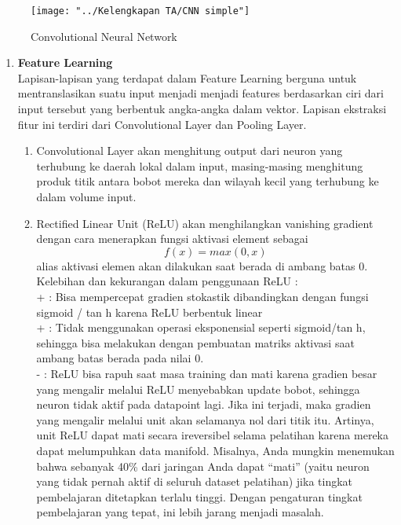 \documentclass[a4paper]{article}
\begin{document}
			\begin{figure}[h]
				\centering
				\texttt{[image: "../Kelengkapan TA/CNN simple"]}
				\caption[CNN]{Convolutional Neural Network}
				\label{fig:cnn-simple}
			\end{figure}
			
			\begin{enumerate}
				\item \textbf {Feature Learning} \\
				\hspace{7mm}Lapisan-lapisan yang terdapat dalam Feature Learning berguna untuk mentranslasikan suatu input menjadi menjadi features berdasarkan ciri dari input tersebut yang berbentuk angka-angka dalam vektor. Lapisan ekstraksi fitur ini terdiri dari Convolutional Layer dan Pooling Layer. 

				\begin{enumerate}
					\item Convolutional Layer akan menghitung output dari neuron yang terhubung ke daerah lokal dalam input, masing-masing menghitung produk titik antara bobot mereka dan wilayah kecil yang terhubung ke dalam volume input.
					
					\item Rectified Linear Unit (ReLU) akan menghilangkan vanishing gradient dengan cara menerapkan fungsi aktivasi element sebagai
					\begin{equation}
						f(x)=max⁡(0,x)
					\end{equation}
					alias aktivasi elemen akan dilakukan saat berada di ambang batas 0. Kelebihan dan kekurangan dalam penggunaan ReLU :\\
					+ : Bisa mempercepat gradien stokastik dibandingkan dengan fungsi sigmoid / tan h karena ReLU berbentuk linear\\
					+ : Tidak menggunakan operasi eksponensial seperti sigmoid/tan h, sehingga bisa melakukan dengan pembuatan matriks aktivasi saat ambang batas berada pada nilai 0.\\
					- : ReLU bisa rapuh saat masa training dan mati karena gradien besar yang mengalir melalui ReLU menyebabkan update bobot, sehingga neuron tidak aktif pada datapoint lagi. Jika ini terjadi, maka gradien yang mengalir melalui unit akan selamanya nol dari titik itu. Artinya, unit ReLU dapat mati secara ireversibel selama pelatihan karena mereka dapat melumpuhkan data manifold. Misalnya, Anda mungkin menemukan bahwa sebanyak 40\% dari jaringan Anda dapat “mati” (yaitu neuron yang tidak pernah aktif di seluruh dataset pelatihan) jika tingkat pembelajaran ditetapkan terlalu tinggi. Dengan pengaturan tingkat pembelajaran yang tepat, ini lebih jarang menjadi masalah.
					

\end{enumerate}
\end{enumerate}
\end{document}
